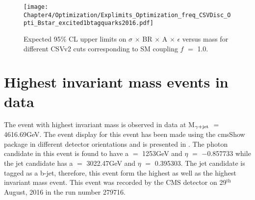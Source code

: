 \begin{table}[htbp]
  \begin{minipage}{0.54\textwidth}
    \begin{figure}[H]
      \texttt{[image: Chapter4/Optimization/Explimits\_Optimization\_freq\_CSVDisc\_Opti\_Bstar\_excited1btagquarks2016.pdf]}
      \caption{Expected 95$\%$ CL upper limits on $\sigma$ $\times$ BR $\times$ A $\times$ $\epsilon$ versus \qstar mass
        for different CSVv2 cuts corresponding to SM coupling $f$ $=$ 1.0.}
      \label{fig:BTagOpti}
    \end{figure}
  \end{minipage}%
  \hfill
  \begin{minipage}{0.44\textwidth}
    \centering
    \caption{CSVv2 cut optimization corresponding to different mass expected limits.}
    \label{Table:BTagOpti}
  \end{minipage}
\end{table}
\section{Highest invariant mass events in data}
The event with highest invariant mass is observed in data at M$_{\gamma+\mathrm{jet}}$ $=$ 4616.69\unit{GeV}. The event display for this event has been made using
the cmsShow~\cite{Web:cmsShow} package in different detector orientations and is presented in \fig{\ref{fig:evtDisplay_highest}}. The photon candidate
in this event is found to have a \pt $=$ 1253\unit{GeV} and $\eta$ $=$ $-$0.857733 while the jet candidate has a \pt $=$ 3022.47\unit{GeV} and
$\eta$ $=$ 0.395303. The jet candidate is tagged as a b-jet, therefore, this event form the highest \qstar as well as the highest \bstar
invariant mass event. This event was recorded by the CMS detector on 29$^{\textrm{th}}$ August, 2016 in the run number 279716.

